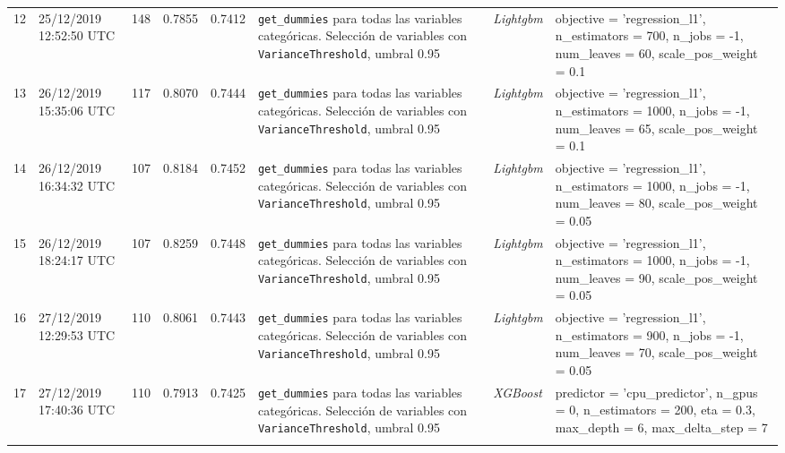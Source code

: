 \documentclass[a4paper, 20pt]{article}
\begin{document}
\begin{longtable}{lL{2.1cm}lllL{3cm}L{2.4cm}L{3.5cm}}
12 & 25/12/2019 12:52:50 UTC & 148 & 0.7855 & 0.7412 & \texttt{get\_dummies} para todas las variables categóricas. Selección de variables con \texttt{VarianceThreshold}, umbral 0.95 & \textit{Lightgbm} & {\ttfamily objective = 'regression\_l1', n\_estimators = 700, n\_jobs = -1, num\_leaves = 60, scale\_pos\_weight = 0.1}\\
\midrule

13 & 26/12/2019 15:35:06 UTC & 117 & 0.8070 & 0.7444 & \texttt{get\_dummies} para todas las variables categóricas. Selección de variables con \texttt{VarianceThreshold}, umbral 0.95 & \textit{Lightgbm} & {\ttfamily objective = 'regression\_l1', n\_estimators = 1000, n\_jobs = -1, num\_leaves = 65, scale\_pos\_weight = 0.1}\\
\midrule

14 & 26/12/2019 16:34:32 UTC & 107 & 0.8184 & 0.7452 & \texttt{get\_dummies} para todas las variables categóricas. Selección de variables con \texttt{VarianceThreshold}, umbral 0.95 & \textit{Lightgbm} & {\ttfamily objective = 'regression\_l1', n\_estimators = 1000, n\_jobs = -1, num\_leaves = 80, scale\_pos\_weight = 0.05}\\
\midrule

15 & 26/12/2019 18:24:17 UTC & 107 & 0.8259 & 0.7448 &\texttt{get\_dummies} para todas las variables categóricas. Selección de variables con \texttt{VarianceThreshold}, umbral 0.95 & \textit{Lightgbm} & {\ttfamily objective = 'regression\_l1', n\_estimators = 1000, n\_jobs = -1, num\_leaves = 90, scale\_pos\_weight = 0.05}\\
\midrule

16 & 27/12/2019 12:29:53 UTC & 110 & 0.8061 & 0.7443 & \texttt{get\_dummies} para todas las variables categóricas. Selección de variables con \texttt{VarianceThreshold}, umbral 0.95 & \textit{Lightgbm} & {\ttfamily objective = 'regression\_l1', n\_estimators = 900, n\_jobs = -1, num\_leaves = 70, scale\_pos\_weight = 0.05}\\
\midrule

17 & 27/12/2019 17:40:36 UTC & 110 & 0.7913 & 0.7425  & \texttt{get\_dummies} para todas las variables categóricas. Selección de variables con \texttt{VarianceThreshold}, umbral 0.95 & \textit{XGBoost} & {\ttfamily predictor = 'cpu\_predictor', n\_gpus = 0, n\_estimators = 200, eta = 0.3, max\_depth = 6, max\_delta\_step = 7}\\
\midrule


\end{longtable}
\end{document}
